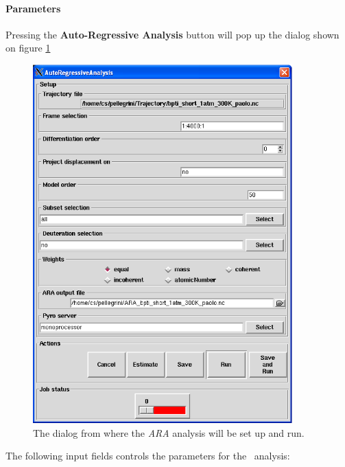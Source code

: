 \documentclass[a4paper,11pt]{report}
\begin{document}
\paragraph{Parameters\\}
\label{ara_parameters}
Pressing the \textbf{Auto-Regressive Analysis} button will pop up the dialog shown on figure \ref{fig:ara}
\begin{figure}[h!]
\begin{center}
\includegraphics[width=10cm]{Figures/ara.eps}
\end{center}
\caption[The \textit{ARA} analysis dialog]{The dialog from where the \textit{ARA} analysis will be set up and run.}
\label{fig:ara}
\end{figure}

The following input fields controls the parameters for the \ARA\ analysis:
\end{document}
